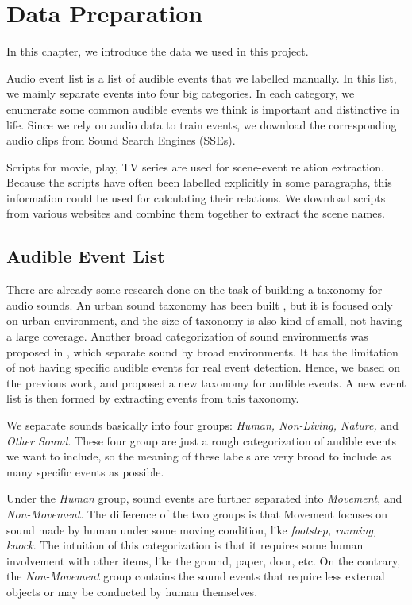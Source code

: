 \chapter{Data Preparation}
In this chapter, we introduce the data we used in this project. 

Audio event list is a list of audible events that we labelled manually.  
In this list, we mainly separate events into four big categories. 
In each category, we enumerate some common audible events we think is important and distinctive in life. 
Since we rely on audio data to train events, we download the corresponding audio clips from Sound Search Engines (SSEs). 

Scripts for movie, play, TV series are used for scene-event relation extraction. 
Because the scripts have often been labelled explicitly in some paragraphs, this information could be used for calculating their relations. 
We download scripts from various websites and combine them together to extract the scene names. 


\section{Audible Event List} 
There are already some research done on the task of building a taxonomy for audio sounds. 
An urban sound taxonomy has been built \cite{salamon2014dataset}, but it is focused only on urban environment, and the size of taxonomy is also kind of small, not having a large coverage. 
Another broad categorization of sound environments was proposed in \cite{brown2011towards}, which separate sound by broad environments. 
It has the limitation of not having specific audible events for real event detection. 
Hence, we based on the previous work, and proposed a new taxonomy for audible events. 
A new event list is then formed by extracting events from this taxonomy.  

We separate sounds basically into four groups: \textit{Human, Non-Living, Nature,} and \textit{Other Sound}. 
These four group are just a rough categorization of audible events we want to include, so the meaning of these labels are very broad to include as many specific events as possible. 

Under the \textit{Human} group, sound events are further separated into \textit{Movement}, and \textit{Non-Movement}. 
The difference of the two groups is that Movement focuses on sound made by human under some moving condition, like \textit{footstep, running, knock}. 
The intuition of this categorization is that it requires some human involvement with other items, like the ground, paper, door, etc.   
On the contrary, the \textit{Non-Movement} group contains the sound events that require less external objects or may be conducted by human themselves.

